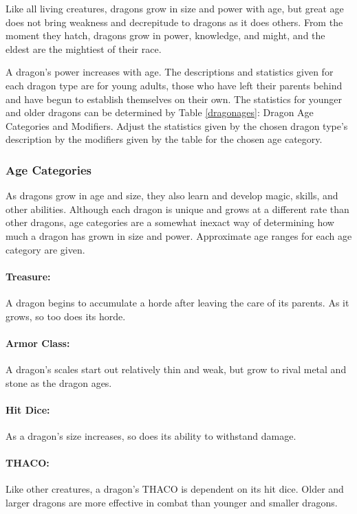 \begin{multicols}{2}
Like all living creatures, dragons grow in size and power with age, but great age does not bring weakness and decrepitude to dragons as it does others. From the moment they hatch, dragons grow in power, knowledge, and might, and the eldest are the mightiest of their race.

A dragon's power increases with age. The descriptions and statistics given for each dragon type are for young adults, those who have left their parents behind and have begun to establish themselves on their own. The statistics for younger and older dragons can be determined by Table \ref{dragonages}: Dragon Age Categories and Modifiers. Adjust the statistics given by the chosen dragon type's description by the modifiers given by the table for the chosen age category.

\subsubsection*{Age Categories} 

As dragons grow in age and size, they also learn and develop magic, skills, and other abilities. Although each dragon is unique and grows at a different rate than other dragons, age categories are a somewhat inexact way of determining how much a dragon has grown in size and power. Approximate age ranges for each age category are given.

\paragraph{Treasure:} A dragon begins to accumulate a horde after leaving the care of its parents. As it grows, so too does its horde.

\paragraph{Armor Class:} A dragon's scales start out relatively thin and weak, but grow to rival metal and stone as the dragon ages.

\paragraph{Hit Dice:} As a dragon's size increases, so does its ability to withstand damage.

\paragraph{THACO:} Like other creatures, a dragon's THACO is dependent on its hit dice. Older and larger dragons are more effective in combat than younger and smaller dragons.


\end{multicols}
